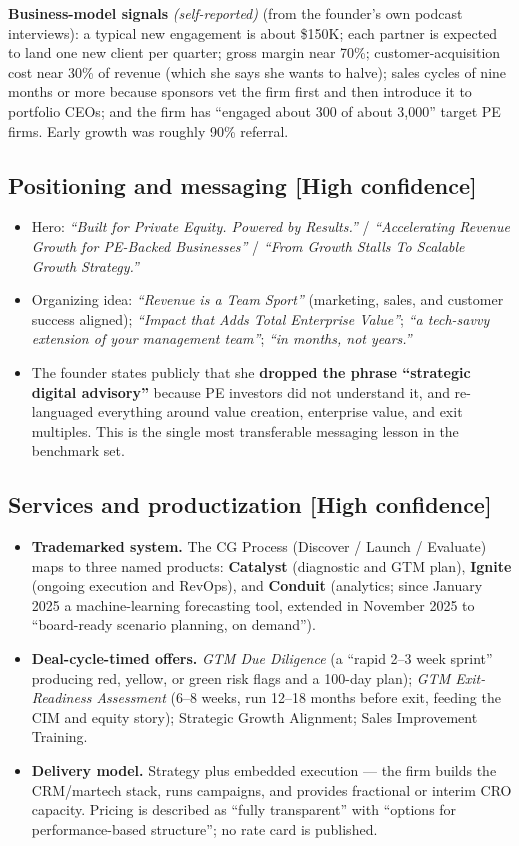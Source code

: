 \documentclass[11pt]{article}
\newcommand{\high}{\textcolor{green!45!black}{\textbf{[High confidence]}}}
\newcommand{\self}{\textcolor{gray!70!black}{\textit{(self-reported)}}}
\begin{document}
\textbf{Business-model signals} \self{} (from the founder's own podcast interviews):
a typical new engagement is about \$150K; each partner is expected to land one new
client per quarter; gross margin near 70\%; customer-acquisition cost near 30\% of
revenue (which she says she wants to halve); sales cycles of nine months or more
because sponsors vet the firm first and then introduce it to portfolio CEOs; and the
firm has ``engaged about 300 of about 3,000'' target PE firms. Early growth was
roughly 90\% referral.

\subsection{Positioning and messaging \high}
\begin{itemize}
  \item Hero: \emph{``Built for Private Equity. Powered by Results.''} /
  \emph{``Accelerating Revenue Growth for PE-Backed Businesses''} /
  \emph{``From Growth Stalls To Scalable Growth Strategy.''}
  \item Organizing idea: \emph{``Revenue is a Team Sport''} (marketing, sales, and
  customer success aligned); \emph{``Impact that Adds Total Enterprise Value''};
  \emph{``a tech-savvy extension of your management team''}; \emph{``in months, not
  years.''}
  \item The founder states publicly that she \textbf{dropped the phrase ``strategic
  digital advisory''} because PE investors did not understand it, and re-languaged
  everything around value creation, enterprise value, and exit multiples. This is the
  single most transferable messaging lesson in the benchmark set.
\end{itemize}

\subsection{Services and productization \high}
\begin{itemize}
  \item \textbf{Trademarked system.} The CG\texttrademark{} Process (Discover / Launch /
  Evaluate) maps to three named products: \textbf{Catalyst\texttrademark{}} (diagnostic
  and GTM plan), \textbf{Ignite\texttrademark{}} (ongoing execution and RevOps), and
  \textbf{Conduit\texttrademark{}} (analytics; since January 2025 a machine-learning
  forecasting tool, extended in November 2025 to ``board-ready scenario planning, on
  demand'').
  \item \textbf{Deal-cycle-timed offers.} \emph{GTM Due Diligence} (a ``rapid 2--3 week
  sprint'' producing red, yellow, or green risk flags and a 100-day plan); \emph{GTM
  Exit-Readiness Assessment} (6--8 weeks, run 12--18 months before exit, feeding the
  CIM and equity story); Strategic Growth Alignment; Sales Improvement Training.
  \item \textbf{Delivery model.} Strategy plus embedded execution --- the firm builds
  the CRM/martech stack, runs campaigns, and provides fractional or interim CRO
  capacity. Pricing is described as ``fully transparent'' with ``options for
  performance-based structure''; no rate card is published.
\end{itemize}
\end{document}
